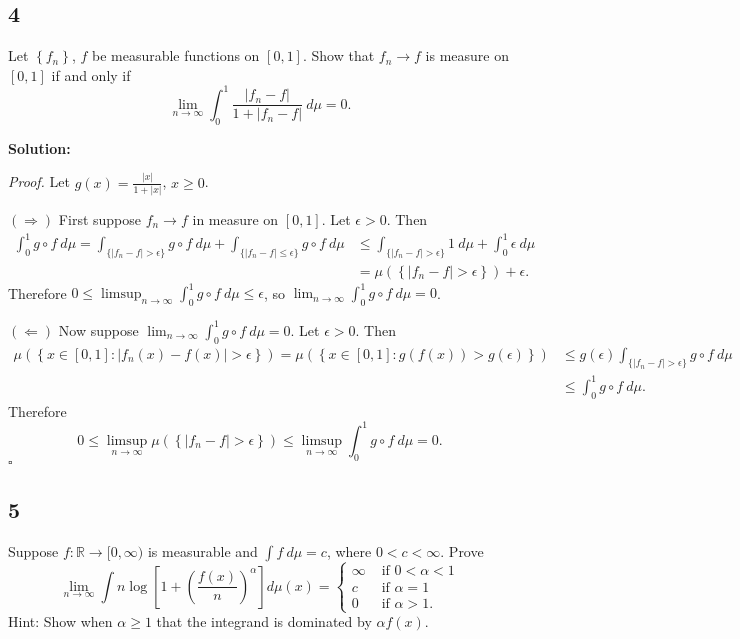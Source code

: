 \documentclass[12pt]{article}
\newcounter{ProofCounter}
\newenvironment{Proof}{\stepcounter{ProofCounter}\textit{Proof.}}{\hfill$\square$}
\begin{document}
\newpage
\subsection*{4}
Let $\left\{ f_{n} \right\}$, $f$ be measurable functions on $[0,1]$. Show that $f_{n} \rightarrow f$ is measure on $[0,1]$ if and only if 
\[ \lim_{n\rightarrow\infty} \int_{0}^{1} \frac{|f_{n} - f|}{1 + |f_{n} - f|} \ d\mu = 0. \]

{\bf Solution:}

\begin{Proof}
Let $g(x) = \frac{|x|}{1+|x|}$, $x \geq 0$.

$(\Rightarrow)$ First suppose $f_{n} \rightarrow f$ in measure on $[0,1]$. Let $\epsilon > 0$. Then
\begin{align*}
\int_{0}^{1}g\circ f\ d\mu  = \int_{\{|f_{n} - f| > \epsilon\}}g\circ f\ d\mu + \int_{\{|f_{n} - f| \leq \epsilon\}}g\circ f\ d\mu & \leq
\int_{\{|f_{n} - f|>\epsilon\}}1\ d\mu + \int_{0}^{1}\epsilon \ d\mu \\
& = \mu\left( \left\{ |f_{n} - f| > \epsilon \right\} \right) + \epsilon.
\end{align*}
Therefore $0 \leq \limsup_{n\rightarrow\infty} \int_{0}^{1} g\circ f \ d\mu \leq \epsilon$, so $\lim_{n\rightarrow\infty}\int_{0}^{1}g\circ f\ d\mu =
0$.

$(\Leftarrow)$ Now suppose $\lim_{n\rightarrow\infty}\int_{0}^{1}g\circ f\ d\mu = 0$. Let $\epsilon > 0$. Then
\begin{align*}
\mu\left( \left\{ x \in [0,1] : |f_{n}(x) - f(x)| > \epsilon \right\} \right) = \mu\left( \left\{ x\in [0,1] : g(f(x)) > g(\epsilon) \right\} \right) & \leq
g(\epsilon) \int_{\{|f_{n} - f| > \epsilon\}}g\circ f\ d\mu  \\
& \leq \int_{0}^{1} g\circ f \ d\mu.
\end{align*}
Therefore 
\[ 0 \leq \limsup_{n\rightarrow\infty}\mu\left( \left\{ |f_{n} - f| > \epsilon \right\} \right) \leq \limsup_{n\rightarrow\infty}\int_{0}^{1}g\circ f\ d\mu = 0. \]
\end{Proof}

\newpage
\subsection*{5}
Suppose $f : \mathbb{R} \rightarrow [0, \infty)$ is measurable and $\int f\ d\mu = c$, where $0 < c < \infty$. Prove 
\[ \lim_{n\rightarrow\infty} \int n \log\left[ 1 + \left( \frac{f(x)}{n} \right)^{\alpha} \right]d\mu(x) = \left\{ \begin{array}{cl}
\infty & \text{ if } 0 < \alpha < 1 \\
c & \text{ if } \alpha = 1 \\
0 & \text{ if } \alpha > 1.
\end{array}\right. \]
Hint: Show when $\alpha \geq 1$ that the integrand is dominated by $\alpha f(x)$.
\end{document}
